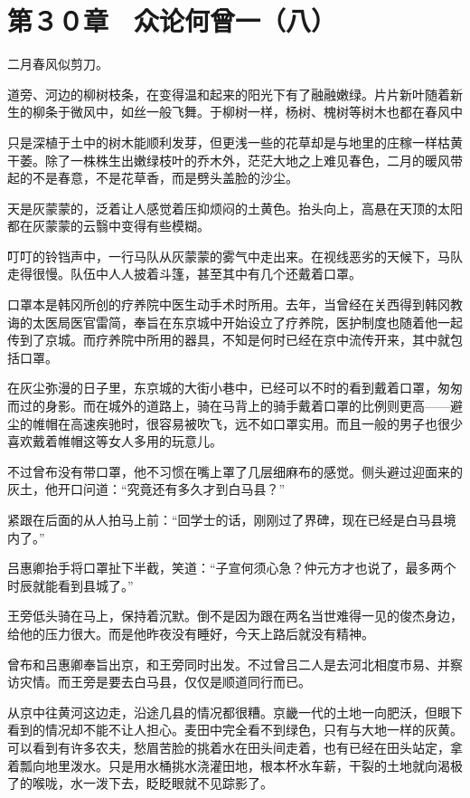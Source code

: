 \section{第３０章　众论何曾一（八）}

二月春风似剪刀。

道旁、河边的柳树枝条，在变得温和起来的阳光下有了融融嫩绿。片片新叶随着新生的柳条于微风中，如丝一般飞舞。于柳树一样，杨树、槐树等树木也都在春风中

只是深植于土中的树木能顺利发芽，但更浅一些的花草却是与地里的庄稼一样枯黄干萎。除了一株株生出嫩绿枝叶的乔木外，茫茫大地之上难见春色，二月的暖风带起的不是春意，不是花草香，而是劈头盖脸的沙尘。

天是灰蒙蒙的，泛着让人感觉着压抑烦闷的土黄色。抬头向上，高悬在天顶的太阳都在灰蒙蒙的云翳中变得有些模糊。

叮叮的铃铛声中，一行马队从灰蒙蒙的雾气中走出来。在视线恶劣的天候下，马队走得很慢。队伍中人人披着斗篷，甚至其中有几个还戴着口罩。

口罩本是韩冈所创的疗养院中医生动手术时所用。去年，当曾经在关西得到韩冈教诲的太医局医官雷简，奉旨在东京城中开始设立了疗养院，医护制度也随着他一起传到了京城。而疗养院中所用的器具，不知是何时已经在京中流传开来，其中就包括口罩。

在灰尘弥漫的日子里，东京城的大街小巷中，已经可以不时的看到戴着口罩，匆匆而过的身影。而在城外的道路上，骑在马背上的骑手戴着口罩的比例则更高——避尘的帷帽在高速疾驰时，很容易被吹飞，远不如口罩实用。而且一般的男子也很少喜欢戴着帷帽这等女人多用的玩意儿。

不过曾布没有带口罩，他不习惯在嘴上罩了几层细麻布的感觉。侧头避过迎面来的灰土，他开口问道：“究竟还有多久才到白马县？”

紧跟在后面的从人拍马上前：“回学士的话，刚刚过了界碑，现在已经是白马县境内了。”

吕惠卿抬手将口罩扯下半截，笑道：“子宣何须心急？仲元方才也说了，最多两个时辰就能看到县城了。”

王旁低头骑在马上，保持着沉默。倒不是因为跟在两名当世难得一见的俊杰身边，给他的压力很大。而是他昨夜没有睡好，今天上路后就没有精神。

曾布和吕惠卿奉旨出京，和王旁同时出发。不过曾吕二人是去河北相度市易、并察访灾情。而王旁是要去白马县，仅仅是顺道同行而已。

从京中往黄河这边走，沿途几县的情况都很糟。京畿一代的土地一向肥沃，但眼下看到的情况却不能不让人担心。麦田中完全看不到绿色，只有与大地一样的灰黄。可以看到有许多农夫，愁眉苦脸的挑着水在田头间走着，也有已经在田头站定，拿着瓢向地里泼水。只是用水桶挑水浇灌田地，根本杯水车薪，干裂的土地就向渴极了的喉咙，水一泼下去，眨眨眼就不见踪影了。

